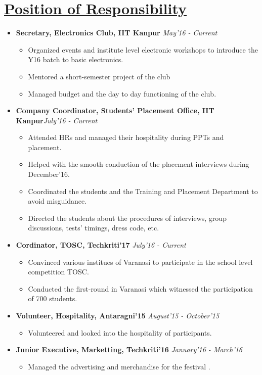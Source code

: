 \documentclass{article}
\begin{document}
\section*{\underline{Position of Responsibility}}
\begin{itemize}
\item \textbf{Secretary, Electronics Club, IIT Kanpur} \hspace{6.1cm}\textit{May'16 - Current}
\begin{itemize}
\item Organized events and institute level electronic workshops to introduce the Y16 batch to basic electronics. 
\item Mentored a short-semester project of the club
\item Managed budget and the day to day functioning of the club.
\end{itemize}
\item \textbf{Company Coordinator, Students' Placement Office, IIT Kanpur}\hspace{2.0cm}\textit{July'16 - Current}
\begin{itemize}
\item Attended HRs and managed their hospitality during PPTs and placement.
\item Helped with the smooth conduction of the placement interviews during December'16.
\item Coordinated the students and the Training and Placement Department to avoid misguidance.
\item Directed the students about the procedures of interviews, group discussions, tests' timings, dress code, etc.
\end{itemize}
\item \textbf{Cordinator, TOSC, Techkriti'17} \hspace{7.5cm}\textit{July'16 - Current}
\begin{itemize}
\item Convinced various institues of Varanasi to participate in the school level competition TOSC.
\item Conducted the first-round in Varanasi which witnessed the participation of 700 students.
\end{itemize}
\item \textbf{Volunteer, Hospitality, Antaragni'15} \hspace{6.7cm}\textit{August'15 - October'15}
\begin{itemize}
\item Volunteered and looked into the hospitality of participants.
\end{itemize}
\item \textbf{Junior Executive, Marketting, Techkriti'16} \hspace{5.5cm}\textit{January'16 - March'16}
\begin{itemize}
\item Managed the advertising and merchandise for the festival . 
\end{itemize}
\end{itemize}
\end{document}
